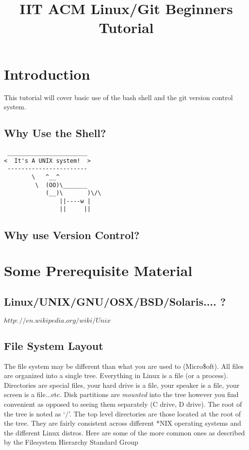 \documentclass[10pt]{article}
\title{IIT ACM Linux/Git Beginners Tutorial}
\begin{document}
\maketitle

\section{Introduction}
This tutorial will cover basic use of the bash shell and the git version control system.

  \subsection{Why Use the Shell?}

  \begin{verbatim}
 _______________________ 
<  It's A UNIX system!  >
 ----------------------- 
        \   ^__^
         \  (OO)\_______
            (__)\       )\/\
                ||----w |
                ||     ||
  \end{verbatim}


  \subsection{Why use Version Control?}

\section{Some Prerequisite Material}

  \subsection{Linux/UNIX/GNU/OSX/BSD/Solaris.... ?}
  $http://en.wikipedia.org/wiki/Unix$
  \subsection{File System Layout}  
  The file system may be different than what you are used to (Micro\$oft). All files are organized into a single tree. Everything in Linux is a file (or a process). Directories are special files, your hard drive is a file, your speaker is a file, your screen is a file...etc. Disk partitions are \textit{mounted} into the tree however you find convenient as opposed to seeing them separately (C drive, D drive). The root of the tree is noted as `$/$'. The top level directories are those located at the root of the tree. They are fairly consistent across different *NIX operating systems and the different Linux distros. Here are some of the more common ones as described by the Filesystem Hierarchy Standard Group~\cite{fhs}
\end{document}
